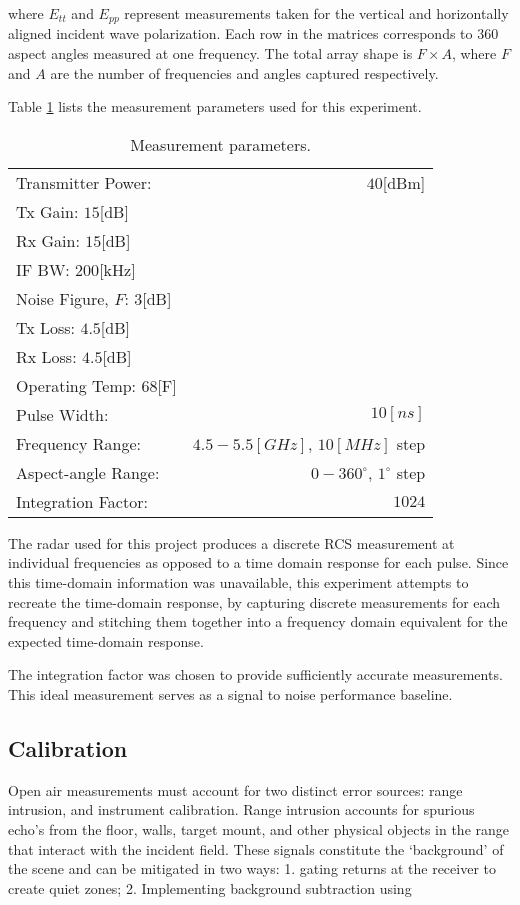   where $E_{tt}$ and $E_{pp}$ represent measurements taken for the vertical and horizontally aligned incident wave polarization. Each row in the matrices corresponds to 360 aspect angles measured at one frequency. The total array shape is $F \times A$, where $F$ and $A$ are the number of frequencies and angles captured respectively.

  Table \ref{tab:m_params} lists the measurement parameters used for this experiment.

  \begin{table}
    \centering
    \begin{tabular}{lr}
      Transmitter Power: & $40$[dBm]\\
      Tx Gain: $15$[dB]\\
      Rx Gain: $15$[dB]\\
      IF BW: $200$[kHz]\\
      Noise Figure, $F$:  $3$[dB]\\
      Tx Loss: $4.5$[dB]\\
      Rx Loss: $4.5$[dB]\\
      Operating Temp: $68$[F]\\
      Pulse Width: & $10[ns]$\\
      Frequency Range: & $4.5-5.5 [GHz]$, $10 [MHz]$ step\\
      Aspect-angle Range: & $0-360 ^{\circ}$, $1^{\circ}$ step\\
      Integration Factor: & $1024$ \\
    \end{tabular}
    \caption{Measurement parameters.}
    \label{tab:m_params}
  \end{table}

  The radar used for this project produces a discrete RCS measurement at individual frequencies as opposed to a time domain response for each pulse. Since this time-domain information was unavailable, this experiment attempts to recreate the time-domain response, by capturing discrete measurements for each frequency and stitching them together into a frequency domain equivalent for the expected time-domain response.

  The integration factor was chosen to provide sufficiently accurate measurements. This ideal measurement serves as a signal to noise performance baseline.

  \subsection{Calibration}
    \label{sec:cal}
    Open air measurements must account for two distinct error sources:  range intrusion, and instrument calibration. Range intrusion accounts for spurious echo's from the floor, walls, target mount, and other physical objects in the range that interact with the incident field. These signals constitute the `background' of the scene and can be mitigated in two ways:  1. gating returns at the receiver to create quiet zones; 2. Implementing background subtraction using

